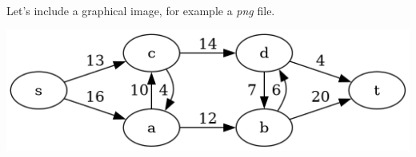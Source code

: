 \documentclass{article}
\begin{document}
Let's include a graphical image, for example a \emph{png} file.

\begin{center}
  \includegraphics[scale=.5]{graph-example}
\end{center}
\end{document}
